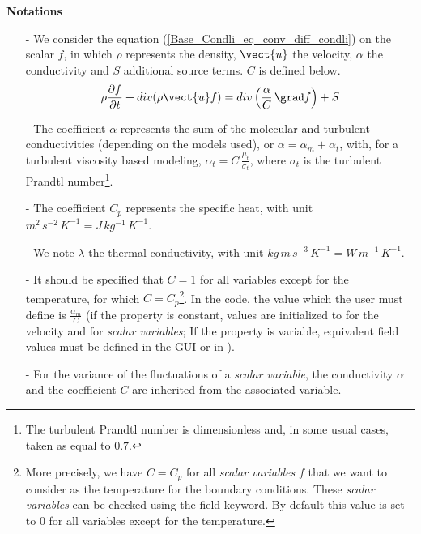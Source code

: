 {\bf Notations}
\begin{itemize}

\item[-] We consider the equation (\ref{Base_Condli_eq_conv_diff_condli})
on the scalar $f$, in which
$\rho$ represents the density, $\vect{u}$ the velocity, $\alpha$ the
conductivity and $S$ additional source terms. $C$ is defined below.
\begin{equation}\label{Base_Condli_eq_conv_diff_condli}
\displaystyle\rho\frac{\partial f}{\partial t} + div(\rho \vect{u} f)=div\left(\displaystyle\frac{\alpha}{C}\, \grad f\right)+S
\end{equation}

\item[-] The coefficient $\alpha$ represents the sum of the
molecular and turbulent conductivities (depending on the models used), or
$\alpha=\alpha_m+\alpha_t$, with, for a turbulent viscosity based modeling,
$\displaystyle\alpha_t=C\,\frac{\mu_t}{\sigma_t}$, where $\sigma_t$ is the
turbulent Prandtl number\footnote{The turbulent Prandtl number is dimensionless and,
in some usual cases, taken as equal to $0.7$.}.

\item[-] The coefficient $C_p$ represents the specific heat, with unit $m^{2}\,s^{-2}\,K^{-1}=J\,kg^{-1}\,K^{ -1}$.

\item[-] We note $\lambda$ the thermal conductivity, with unit
$kg\,m\,s^{-3}\,K^{-1}=W\,m^{-1}\,K^{-1}$.

\item[-] It should be specified that $C=1$ for all variables except for the
temperature, for which $C=C_p$\footnote{More precisely, we have
$C=C_p$ for all {\it scalar variables} $f$ that we want to consider as the
temperature for the boundary conditions. These {\it scalar variables} can
be checked using the  field keyword. By default this
value is set to 0 for all variables except for the temperature.}.
In the code, the value which the user must define is
$\displaystyle\frac{\alpha_m}{C}$ (if the property is constant, values are
initialized to  for the velocity and  for {\it scalar variables};
If the property is variable, equivalent field values must be defined in the GUI or
in ).

\item[-] For the variance of the fluctuations of a {\it scalar variable}, the
conductivity $\alpha$ and the coefficient $C$ are inherited from the
associated variable.

\end{itemize}


